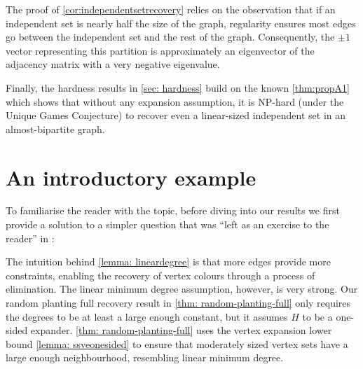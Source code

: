 The proof of \cref{cor:independentsetrecovery} relies on the observation that if an independent set is nearly half the size of the graph, regularity ensures most edges go between the independent set and the rest of the graph. Consequently, the $\pm 1$ vector representing this partition is approximately an eigenvector of the adjacency matrix with a very negative eigenvalue.

Finally, the hardness results in \cref{sec: hardness} build on the known \cref{thm:propA1} which shows that without any expansion assumption, it is NP-hard (under the Unique Games Conjecture) to recover even a linear-sized independent set in an almost-bipartite graph.

\section{An introductory example}

To familiarise the reader with the topic, before diving into our results we first provide a solution to a simpler question that was ``left as an exercise to the reader'' in \cite{MR3536556-David16}:


The intuition behind \cref{lemma: lineardegree} is that more edges provide more constraints, enabling the recovery of vertex colours through a process of elimination. The linear minimum degree assumption, however, is very strong. Our random planting full recovery result in \cref{thm: random-planting-full} only requires the degrees to be at least a large enough constant, but it assumes $H$ to be a one-sided expander. \cref{thm: random-planting-full} uses the vertex expansion lower bound \cref{lemma: ssveonesided} to ensure that moderately sized vertex sets have a large enough neighbourhood, resembling linear minimum degree.

